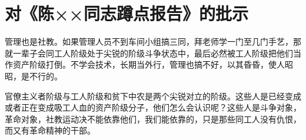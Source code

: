 \section[对《陈××同志蹲点报告》的批示（一九六五年一月二十九日）]{对《陈××同志蹲点报告》的批示}


管理也是社教。如果管理人员不到车间小组搞三同，拜老师学一门至几门手艺，那就一辈子会同工人阶级处于尖锐的阶级斗争状态中，最后必然被工人阶级把他们当作资产阶级打倒。不学会技术，长期当外行，管理也搞不好，以其昏昏，使人昭昭，是不行的。

官僚主义者阶级与工人阶级和贫下中农是两个尖锐对立的阶级。这些人是已经变成或者正在变成吸工人血的资产阶级分子，他们怎么会认识呢？这些人是斗争对象，革命对象，社教运动决不能依靠他们，我们能依靠的，只是那些同工人没有仇恨，而又有革命精神的干部。


